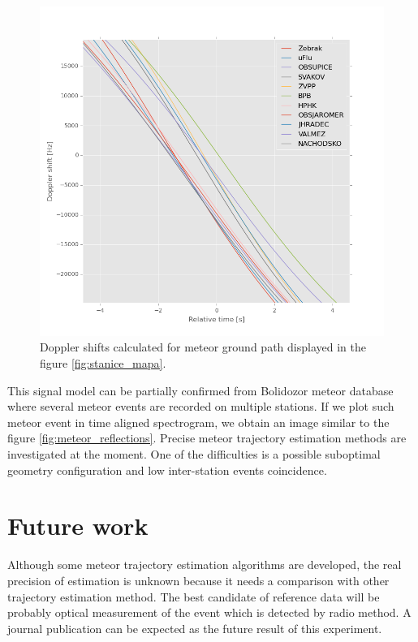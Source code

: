 \documentclass[twoside]{ctuthesis}
\theoremstyle{plain}
\theoremstyle{definition}
\theoremstyle{note}
\begin{document}
\begin{figure}
 \begin{center}
 \includegraphics[width=\textwidth]{./img/Meteor_dopplers.png}
 \caption{Doppler shifts calculated for meteor ground path displayed in the figure \ref{fig:stanice_mapa}.}
  \label{fig:dopplers} 
 \end{center}
\end{figure}


This signal model can be partially confirmed from Bolidozor meteor database where several meteor events are recorded on multiple stations. If we plot such meteor event in time aligned spectrogram, we obtain an image similar to the figure \ref{fig:meteor_reflections}.
Precise meteor trajectory estimation methods are investigated at the moment.  One of the difficulties is a possible suboptimal geometry configuration and low inter-station events coincidence.


\chapter{Future work}

Although some meteor trajectory estimation algorithms are developed, the real precision of estimation is unknown because it needs a comparison with other trajectory estimation method\cite{Bolidozor_trajectory}. The best candidate of reference data will be probably optical measurement of the event which is detected by radio method. A journal publication can be expected as the future result of this experiment. 
\end{document}
